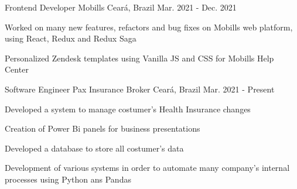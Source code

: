 

\begin{cventries}

\cventry
{Frontend Developer} %
{Mobills} %
{Ceará, Brazil} %
{Mar. 2021 - Dec. 2021} %
{
  \begin{cvitems} %
    \item {Worked on many new features,
    refactors and bug fixes on Mobills
    web platform, using React, Redux
    and Redux Saga}
    \item {Personalized Zendesk templates
    using Vanilla JS and CSS for
    Mobills Help Center}
  \end{cvitems}
}

  \cventry
    {Software Engineer} %
    {Pax Insurance Broker} %
    {Ceará, Brazil} %
    {Mar. 2021 - Present} %
    {
      \begin{cvitems} %
        \item {Developed a system to manage costumer's Health Insurance changes}
        \item {Creation of Power Bi panels for business presentations}
        \item {Developed a database to store
        all costumer's data}
        \item {Development of various systems in order to automate many company's internal processes using Python ans Pandas}
      \end{cvitems}
    }

\end{cventries}
